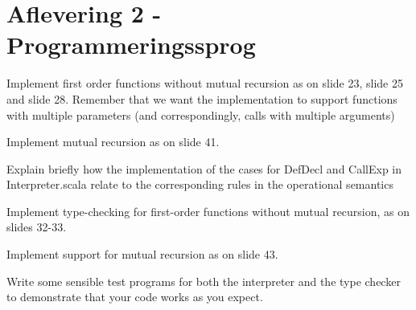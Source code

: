 \documentclass[working, oneside]{../../../../Preambles/tuftebook}
\begin{document}
\let\cleardoublepage\clearpage
\thispagestyle{fancy}
\chapter{Aflevering 2 - Programmeringssprog}
\begin{exercise}[1]
Implement first order functions without mutual recursion as on slide 23, slide 25 and slide 28. Remember that we want the implementation to support functions with multiple parameters (and correspondingly, calls with multiple arguments)
\end{exercise}
\begin{exercise}[2 - optional]
Implement mutual recursion as on slide 41.
\end{exercise}
\begin{exercise}[3]
Explain briefly how the implementation of the cases for DefDecl and CallExp in Interpreter.scala relate to the corresponding rules in the operational semantics
\end{exercise}
\begin{exercise}[4]
Implement type-checking for first-order functions without mutual recursion, as on slides 32-33. 
\end{exercise}
\begin{exercise}[5 - optional]
Implement support for mutual recursion as on slide 43.
\end{exercise}
\begin{exercise}[6]
Write some sensible test programs for both the interpreter and the type checker to demonstrate that your code works as you expect.
\end{exercise}
\end{document}
